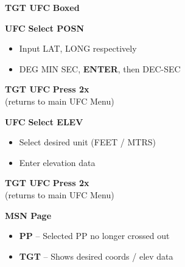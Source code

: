 \documentclass[fontInter]{TechCheck}
\begin{document}
\begin{checklistenumerate}
{\begin{subenumerate}
			\item \textbf{TGT UFC} \dotfill \textbf{Boxed}
			\item \textbf{UFC} \dotfill \textbf{Select POSN}
			\begin{itemize}
				\item Input LAT, LONG respectively
				\item DEG MIN SEC, \textbf{ENTER}, then DEC-SEC
			\end{itemize}
			\item \textbf{TGT UFC} \dotfill \textbf{Press 2x} \\
			\hfill (returns to main UFC Menu)
			\item \textbf{UFC} \dotfill \textbf{Select ELEV}
			\begin{itemize}
				\item Select desired unit (FEET / MTRS)
				\item Enter elevation data
			\end{itemize}
			\item \textbf{TGT UFC} \dotfill \textbf{Press 2x} \\
			\hfill (returns to main UFC Menu)
			\item \textbf{MSN Page}
			\begin{itemize}
				\item \textbf{PP} -- Selected PP no longer crossed out
				\item \textbf{TGT} -- Shows desired coords / elev data 	
			\end{itemize}
		\end{subenumerate}}
	\end{checklistenumerate}

	\clearpage
\end{document}
